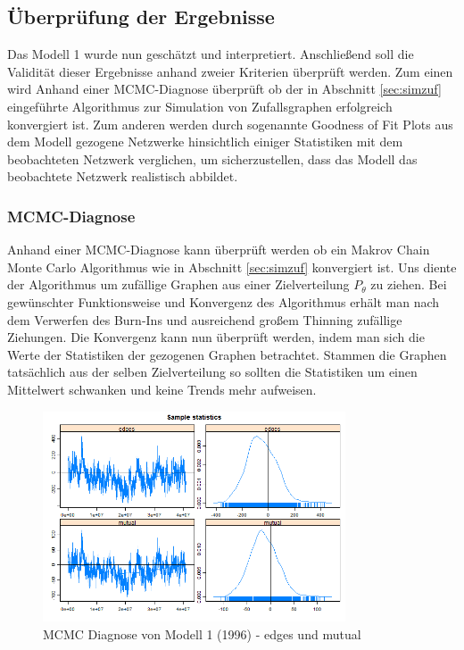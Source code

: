 \documentclass[a4paper,ngerman,oneside,titlepage,bibliography=totoc,11pt]{scrreprt}
\begin{document}
\subsection{Überprüfung der Ergebnisse}
Das Modell 1 wurde nun geschätzt und interpretiert. Anschließend soll die Validität dieser Ergebnisse anhand zweier Kriterien überprüft werden. Zum einen wird Anhand einer MCMC-Diagnose überprüft ob der in Abschnitt \ref{sec:simzuf} eingeführte Algorithmus zur Simulation von Zufallsgraphen erfolgreich konvergiert ist. Zum anderen werden durch sogenannte Goodness of Fit Plots aus dem Modell gezogene Netzwerke hinsichtlich einiger Statistiken mit dem beobachteten Netzwerk verglichen, um sicherzustellen, dass das Modell das beobachtete Netzwerk realistisch abbildet.
\subsubsection{MCMC-Diagnose}
Anhand einer MCMC-Diagnose kann überprüft werden ob ein Makrov Chain Monte Carlo Algorithmus wie in Abschnitt \ref{sec:simzuf} konvergiert ist. Uns diente der Algorithmus um zufällige Graphen aus einer Zielverteilung $P_{\theta}$ zu ziehen. Bei gewünschter Funktionsweise und Konvergenz des Algorithmus erhält man nach dem Verwerfen des Burn-Ins und ausreichend großem Thinning zufällige Ziehungen. Die Konvergenz kann nun überprüft werden, indem man sich die Werte der Statistiken der gezogenen Graphen betrachtet. Stammen die Graphen tatsächlich aus der selben Zielverteilung so sollten die Statistiken um einen Mittelwert schwanken und keine Trends mehr aufweisen.

	\begin{figure}[h]
	\centering
		\includegraphics[width=0.8\textwidth]{Grafiken/mcmc_diag1.png}
	\caption{MCMC Diagnose von Modell 1 (1996) - edges und mutual}
	\end{figure}
	
\end{document}
